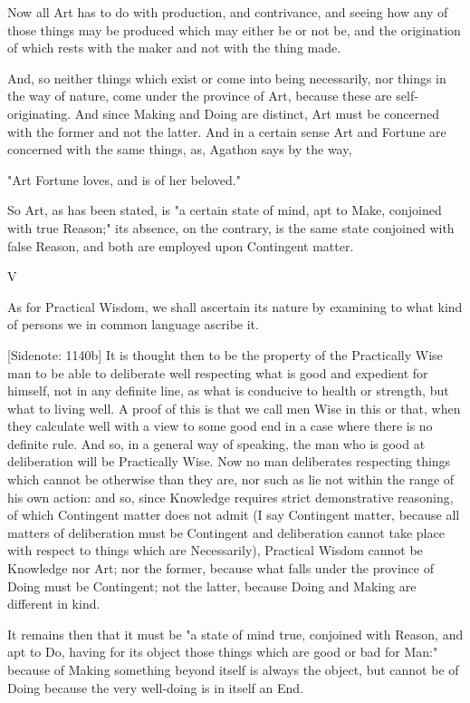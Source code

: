 Now all Art has to do with production, and contrivance, and seeing how
any of those things may be produced which may either be or not be, and
the origination of which rests with the maker and not with the thing
made.

And, so neither things which exist or come into being necessarily, nor
things in the way of nature, come under the province of Art, because
these are self-originating. And since Making and Doing are distinct, Art
must be concerned with the former and not the latter. And in a certain
sense Art and Fortune are concerned with the same things, as, Agathon
says by the way,

  "Art Fortune loves, and is of her beloved."

So Art, as has been stated, is "a certain state of mind, apt to Make,
conjoined with true Reason;" its absence, on the contrary, is the same
state conjoined with false Reason, and both are employed upon Contingent
matter.

V

As for Practical Wisdom, we shall ascertain its nature by examining to
what kind of persons we in common language ascribe it.

[Sidenote: 1140b] It is thought then to be the property of the
Practically Wise man to be able to deliberate well respecting what is
good and expedient for himself, not in any definite line, as what is
conducive to health or strength, but what to living well. A proof of
this is that we call men Wise in this or that, when they calculate well
with a view to some good end in a case where there is no definite
rule. And so, in a general way of speaking, the man who is good at
deliberation will be Practically Wise. Now no man deliberates respecting
things which cannot be otherwise than they are, nor such as lie not
within the range of his own action: and so, since Knowledge requires
strict demonstrative reasoning, of which Contingent matter does not
admit (I say Contingent matter, because all matters of deliberation must
be Contingent and deliberation cannot take place with respect to things
which are Necessarily), Practical Wisdom cannot be Knowledge nor Art;
nor the former, because what falls under the province of Doing must be
Contingent; not the latter, because Doing and Making are different in
kind.

It remains then that it must be "a state of mind true, conjoined with
Reason, and apt to Do, having for its object those things which are good
or bad for Man:" because of Making something beyond itself is always the
object, but cannot be of Doing because the very well-doing is in itself
an End.

